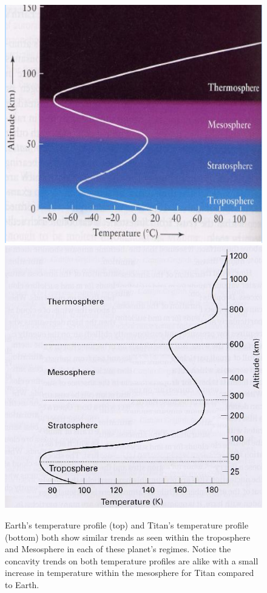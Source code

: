 \documentclass[useAMS,natbib]{mn2e}
\begin{document}
\begin{figure}
\includegraphics[scale = 0.6]{earth_temp}
\includegraphics[scale = 0.45]{Titan_temp}
\caption{Earth's temperature profile (top) and Titan's temperature profile (bottom) both show similar trends as seen within the troposphere and Mesosphere in each of these planet's regimes. Notice the concavity trends on both temperature profiles are alike with a small increase in temperature within the mesosphere for Titan compared to Earth.}
\label{temp}
\end{figure}
\end{document}

